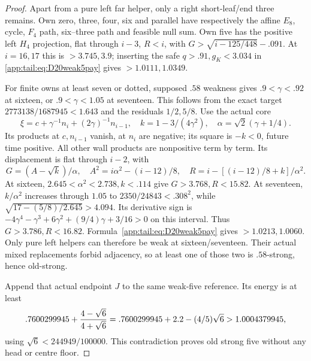 \begin{proof}
Apart from a pure left far helper, only a right short-leaf/end
three remains. Own zero, three, four, six and parallel have
respectively the affine $E_8$, cycle, $F_4$ path, six--three
path and feasible null sum. Own five has the positive left
$H_4$ projection, flat through $i-3$, $R<i$, with
$G>\sqrt{i-125/448}-.091$.
At $i=16,17$ this is $>3.745,3.9$; inserting the safe
$q>.91,g_K<3.034$ in \eqref{app:tail:eq:D20weak5pay} gives
$>1.0111,1.0349$.

For finite owns at least seven or dotted, supposed $.58$
weakness gives $.9<\gamma<.92$ at sixteen, or
$.9<\gamma<1.05$ at seventeen. This follows from the exact
target $2773138/1687945<1.643$ and the residuals $1/2,5/8$.
Use the actual core
\[
 \xi=c+\gamma^{-1}n_i+(2\gamma)^{-1}n_{i-1},\quad
 k=1-3/(4\gamma^2),\quad \alpha=\sqrt2(\gamma+1/4).
\]
Its products at $c,n_{i-1}$ vanish, at $n_i$ are negative;
its square is $-k<0$, future time positive. All other wall
products are nonpositive term by term. Its displacement is
flat through $i-2$, with
\[
 G=(A-\sqrt k)/\alpha,
 \quad A^2=i\alpha^2-(i-12)/8,
 \quad R=i-[(i-12)/8+k]/\alpha^2.
\]
At sixteen, $2.645<\alpha^2<2.738,k<.114$ give
$G>3.768,R<15.82$. At seventeen,
$k/\alpha^2$ increases through $1.05$ to
$2350/24843<.308^2$, while
$\sqrt{17-(5/8)/2.645}>4.094$.
Its derivative sign is
$-4\gamma^4-\gamma^3+6\gamma^2+(9/4)\gamma+3/16>0$
on this interval. Thus $G>3.786,R<16.82$.
Formula~\eqref{app:tail:eq:D20weak5pay} gives $>1.0213,1.0060$.
Only pure left helpers can therefore be weak at sixteen/seventeen.
Their actual mixed replacements forbid adjacency, so at least one
of those two is $.58$-strong, hence old-strong.

Append that actual endpoint $J$ to the same weak-five reference.
Its energy is at least
\[
 .7600299945+{4-\sqrt6\over4+\sqrt6}
 =.7600299945+2.2-(4/5)\sqrt6
 >1.0004379945,
\]
using $\sqrt6<244949/100000$. This contradiction proves old
strong five without any head or centre floor.
\end{proof}


